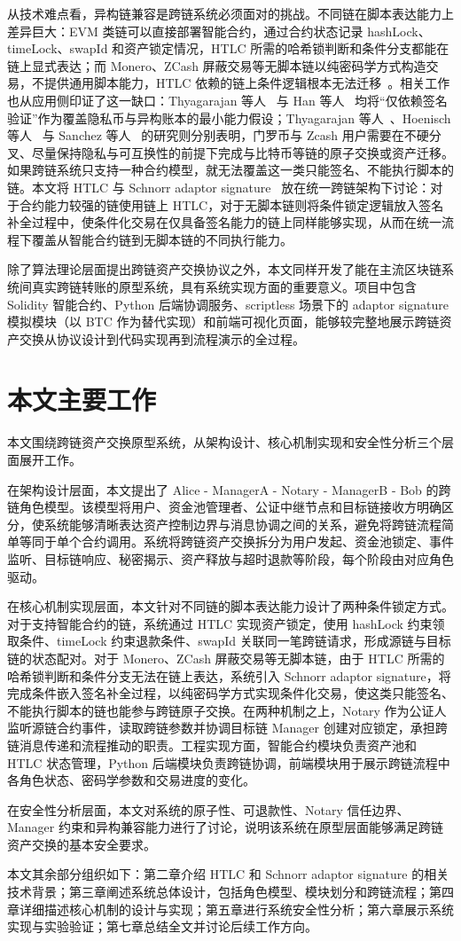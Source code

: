 从技术难点看，异构链兼容是跨链系统必须面对的挑战。不同链在脚本表达能力上差异巨大：EVM 类链可以直接部署智能合约，通过合约状态记录 hashLock、timeLock、swapId 和资产锁定情况，HTLC 所需的哈希锁判断和条件分支都能在链上显式表达；而 Monero、ZCash 屏蔽交易等无脚本链以纯密码学方式构造交易，不提供通用脚本能力，HTLC 依赖的链上条件逻辑根本无法迁移~\cite{9833731}。相关工作也从应用侧印证了这一缺口：Thyagarajan 等人~\cite{thyagarajan2022universal} 与 Han 等人~\cite{han2025p2c2t} 均将“仅依赖签名验证”作为覆盖隐私币与异构账本的最小能力假设；Thyagarajan 等人~\cite{thyagarajan2022paymo}、Hoenisch 等人~\cite{hoenisch2022lightswap} 与 Sanchez 等人~\cite{sanchez2022zclaim} 的研究则分别表明，门罗币与 Zcash 用户需要在不硬分叉、尽量保持隐私与可互换性的前提下完成与比特币等链的原子交换或资产迁移。如果跨链系统只支持一种合约模型，就无法覆盖这一类只能签名、不能执行脚本的链。本文将 HTLC 与 Schnorr adaptor signature~\cite{9833731} 放在统一跨链架构下讨论：对于合约能力较强的链使用链上 HTLC，对于无脚本链则将条件锁定逻辑放入签名补全过程中，使条件化交易在仅具备签名能力的链上同样能够实现，从而在统一流程下覆盖从智能合约链到无脚本链的不同执行能力。

除了算法理论层面提出跨链资产交换协议之外，本文同样开发了能在主流区块链系统间真实跨链转账的原型系统，具有系统实现方面的重要意义。项目中包含 Solidity 智能合约、Python 后端协调服务、scriptless 场景下的 adaptor signature 模拟模块（以 BTC 作为替代实现）和前端可视化页面，能够较完整地展示跨链资产交换从协议设计到代码实现再到流程演示的全过程。

\section{本文主要工作}

本文围绕跨链资产交换原型系统，从架构设计、核心机制实现和安全性分析三个层面展开工作。

在架构设计层面，本文提出了 Alice - ManagerA - Notary - ManagerB - Bob 的跨链角色模型。该模型将用户、资金池管理者、公证中继节点和目标链接收方明确区分，使系统能够清晰表达资产控制边界与消息协调之间的关系，避免将跨链流程简单等同于单个合约调用。系统将跨链资产交换拆分为用户发起、资金池锁定、事件监听、目标链响应、秘密揭示、资产释放与超时退款等阶段，每个阶段由对应角色驱动。

在核心机制实现层面，本文针对不同链的脚本表达能力设计了两种条件锁定方式。对于支持智能合约的链，系统通过 HTLC 实现资产锁定，使用 hashLock 约束领取条件、timeLock 约束退款条件、swapId 关联同一笔跨链请求，形成源链与目标链的状态配对。对于 Monero、ZCash 屏蔽交易等无脚本链，由于 HTLC 所需的哈希锁判断和条件分支无法在链上表达，系统引入 Schnorr adaptor signature，将完成条件嵌入签名补全过程，以纯密码学方式实现条件化交易，使这类只能签名、不能执行脚本的链也能参与跨链原子交换。在两种机制之上，Notary 作为公证人监听源链合约事件，读取跨链参数并协调目标链 Manager 创建对应锁定，承担跨链消息传递和流程推动的职责。工程实现方面，智能合约模块负责资产池和 HTLC 状态管理，Python 后端模块负责跨链协调，前端模块用于展示跨链流程中各角色状态、密码学参数和交易进度的变化。

在安全性分析层面，本文对系统的原子性、可退款性、Notary 信任边界、Manager 约束和异构兼容能力进行了讨论，说明该系统在原型层面能够满足跨链资产交换的基本安全要求。

本文其余部分组织如下：第二章介绍 HTLC 和 Schnorr adaptor signature 的相关技术背景；第三章阐述系统总体设计，包括角色模型、模块划分和跨链流程；第四章详细描述核心机制的设计与实现；第五章进行系统安全性分析；第六章展示系统实现与实验验证；第七章总结全文并讨论后续工作方向。

